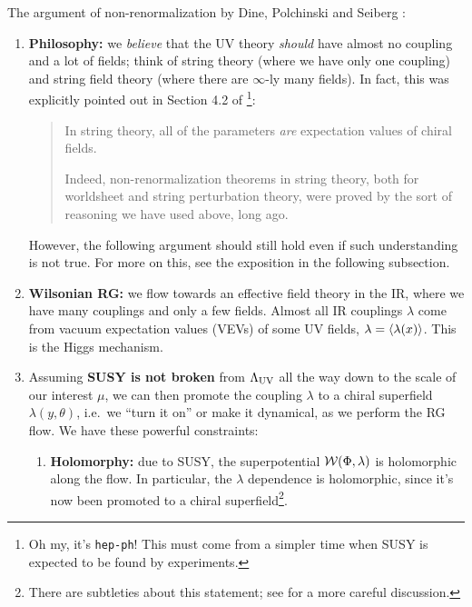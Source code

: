 \documentclass[a4paper
	,10pt
]{article}
\makeatletter
\newcommand{\nobeginpar}{\@beginparpenalty=10000}
\makeatother
\begin{document}
{\nobeginpar
	The argument of non-renormalization by Dine, Polchinski and Seiberg \cite{Seiberg:1993vc}: 
	
	\begin{enumerate}
	\item \textbf{Philosophy:} we \textit{believe} that the UV theory \textit{should} have almost no coupling and a lot of fields; think of string theory (where we have only one coupling) and string field theory (where there are $\infty$-ly many fields). In fact, this was explicitly pointed out in Section 4.2 of \mbox{\textcite{Dine:1996ui}}\footnote{
		Oh my, it's \texttt{hep-ph}! This must come from a simpler time when SUSY is expected to be found by experiments. 
	}:
	
		\begin{quote}
			In string theory, all of the parameters \textit{are} expectation values of chiral fields.
			
			Indeed, non-renormalization theorems in string theory, both for worldsheet and string perturbation theory, were proved by the sort of reasoning we have used above, long ago. 
		\end{quote}
	
	However, the following argument should still hold even if such understanding is not true. For more on this, see the exposition in the following subsection. 
	
	\item \textbf{Wilsonian RG:} we flow towards an effective field theory in the IR, where we have many couplings and only a few fields. Almost all IR couplings $\lambda$ come from vacuum expectation values (VEVs) of some UV fields, $\lambda = \langle\lambda(x)\rangle$. This is the Higgs mechanism. 
	
	\item Assuming \textbf{SUSY is not broken} from $\Lambda_{\mathrm{UV}}$ all the way down to the scale of our interest $\mu$, we can then promote the coupling $\lambda$ to a chiral superfield $\lambda(y,\theta)$, i.e.~we ``turn it on'' or make it dynamical, as we perform the RG flow. We have these powerful constraints:
	
		\begin{enumerate}
		\item \textbf{Holomorphy:} due to SUSY, the superpotential $\mathcal{W}(\Phi,\lambda)$ is holomorphic along the flow. 
		In particular, the $\lambda$ dependence is holomorphic, since it's now been promoted to a chiral superfield\footnote{
			There are subtleties about this statement; see \cite{Dine:1994su} for a more careful discussion. 
		}. 
		

\end{enumerate}
\end{enumerate}}
\end{document}

